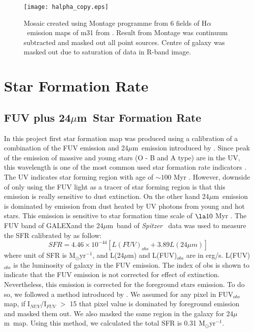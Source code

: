 \documentclass[useAMS,usenatbib]{mn2e}
\newcommand \halpha    {H$\alpha $\ }
\newcommand \um    {$\mu$m\ }
\newcommand \Spitzer {{\it Spitzer}}
\newcommand \Galex {GALEX}
\begin{document}
\begin{figure*}
 {\vfil  \texttt{[image: halpha\_copy.eps]}
  \caption{Mosaic created using Montage programme from 6 fields of \halpha emission maps of m31 from . Result from Montage was continuum subtracted and masked out all point sources. Centre of galaxy was masked out due to saturation of data in R-band image.\label{fig:halpha}}
 \vfil}
\end{figure*}


\section{Star Formation Rate}
\subsection{FUV plus 24\um Star Formation Rate}

In this project first star formation map was produced using a calibration of a combination of the FUV emission and 24\um emission introduced by \cite{Hao11}. Since peak of the emission of massive and young stars (O - B and A type) are in the UV, this wavelength is one of the most common used star formation rate indicators \citep[e.g.,][]{Kennicutt89}. The UV indicates star forming region with age of $\sim 100$ Myr \citep[e.g.,][]{Kennicutt98, Calzetti05}. However, downside of only using the FUV light as a tracer of star forming region is that this emission is really sensitive to dust extinction. On the other hand 24\um emission is dominated by emission from dust heated by UV photons from young and hot stars. This emission is sensitive to star formation time scale of $\la10$ Myr \citep{Calzetti07}.
The FUV band of \Galex and the 24\um band of \Spitzer ~ data was used to measure the SFR calibrated by \cite{Hao11} as follow:
\begin{equation}
\label{equ: fuvplus24}
SFR =4.46\times10^{-44}[L(FUV)_{obs}+3.89L(24\mu m)]
\end{equation}
where unit of SFR is M$_{\odot}$yr$^{-1}$, and L(24$\mu$m) and L(FUV)$_{obs}$ are in erg/s. L(FUV)$_{obs}$ is the luminosity of galaxy in the FUV emission. The index of obs is shown to indicate that the FUV emission is not corrected for effect of extinction. Nevertheless, this emission is corrected for the foreground stars emission. To do so, we followed a method introduced by \cite{Leroy08}. We assumed for any pixel in FUV$_{obs}$ map, %
if I$_{NUV}$/I$_{FUV}$ $>$ 15 that pixel value is dominated by foreground emission and masked them out. We also masked the same region in the galaxy for 24\um map. Using this method, we calculated the total SFR is 0.31 M$_{\odot}$yr$^{-1}$.
\end{document}
